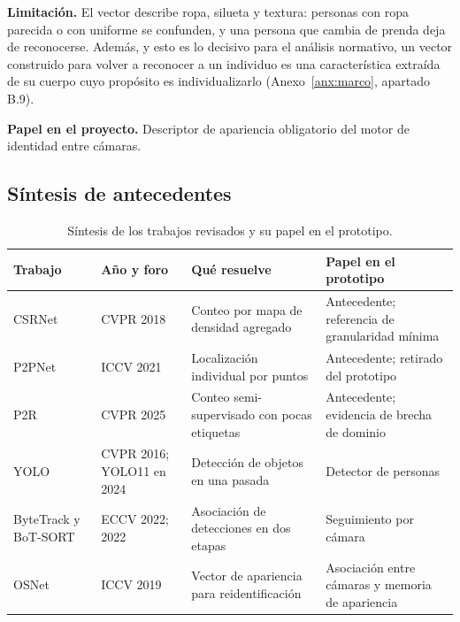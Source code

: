 \textbf{Limitación.} El vector describe ropa, silueta y textura: personas con ropa parecida o con
uniforme se confunden, y una persona que cambia de prenda deja de reconocerse. Además, y
esto es lo decisivo para el análisis normativo, un vector construido para volver a reconocer a un
individuo es una característica extraída de su cuerpo cuyo propósito es individualizarlo
(Anexo~\ref{anx:marco}, apartado B.9).

\textbf{Papel en el proyecto.} Descriptor de apariencia obligatorio del motor de identidad entre
cámaras.

\subsection{Síntesis de antecedentes}
\label{subsec:sintesis-antecedentes}

\begin{table}[H]
\centering
\small
\caption{Síntesis de los trabajos revisados y su papel en el prototipo.}
\label{tab:sintesis-antecedentes}
\begin{tabular}{@{}L{2.4cm}L{2.6cm}L{4.4cm}L{4.4cm}@{}}
\toprule
\textbf{Trabajo} & \textbf{Año y foro} & \textbf{Qué resuelve} & \textbf{Papel en el prototipo} \\
\midrule
CSRNet & CVPR 2018 & Conteo por mapa de densidad agregado & Antecedente; referencia de granularidad mínima \\
P2PNet & ICCV 2021 & Localización individual por puntos & Antecedente; retirado del prototipo \\
P2R & CVPR 2025 & Conteo semi-supervisado con pocas etiquetas & Antecedente; evidencia de brecha de dominio \\
YOLO & CVPR 2016; YOLO11 en 2024 & Detección de objetos en una pasada & Detector de personas \\
ByteTrack y BoT-SORT & ECCV 2022; 2022 & Asociación de detecciones en dos etapas & Seguimiento por cámara \\
OSNet & ICCV 2019 & Vector de apariencia para reidentificación & Asociación entre cámaras y memoria de apariencia \\
\bottomrule
\end{tabular}
\end{table}

